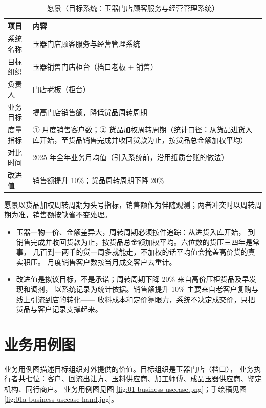 \begin{table}[H]
\centering
\caption{愿景（目标系统：玉器门店顾客服务与经营管理系统）}
\begin{tabularx}{\textwidth}{@{}L{2.6cm} Y@{}}
\toprule
项目 & 内容 \\
\midrule
系统名称 & 玉器门店顾客服务与经营管理系统 \\
目标组织 & 玉器销售门店柜台（档口老板 + 销售） \\
负责人 & 门店老板（柜台） \\
业务目标 & 提高门店销售额，降低货品周转周期 \\
度量指标 & ① 月度销售客户数；② 货品加权周转周期（统计口径：从货品进货入库开始，至货品销售完成并收回货款为止，按货品总金额加权平均） \\
对比时间 & 2025 年全年业务月均值（引入系统前，沿用纸质台账的做法） \\
改进值 & 销售额提升 10\%；货品周转周期下降 20\% \\
\bottomrule
\end{tabularx}
\end{table}

愿景以货品加权周转周期为头号指标，销售额作为伴随观测；两者冲突时以周转周期为准，销售额按缺省不变处理。

\begin{itemize}[leftmargin=1.6em, itemsep=2pt]
  \item 玉器一物一价、金额差异大，周转周期必须按件追踪：从进货入库开始，
        到销售完成并收回货款为止，按货品总金额加权平均。六位数的货压三四年是常事，
        几百到一两千的货一周多就能走，不加权的话平均值会掩盖高价货的真实积压。
        月度销售客户数按当月成交客户去重计。
  \item 改进值是拟议目标，不是承诺；周转周期下降 20\% 来自高价压柜货品及早发现和调剂，
        以系统记录为统计依据。销售额提升 10\% 主要来自老客户复购与线上引流到店的转化——
        收料成本和定价靠眼力，系统不决定成交价，只把货品与客户记录支撑起来。
\end{itemize}

\section{业务用例图}

业务用例图描述目标组织对外提供的价值。目标组织是玉器门店（档口），
业务执行者共七位：客户、回流出让方、玉料供应商、加工师傅、成品玉器供应商、鉴定机构、同行商户。
业务用例图见图 \ref{fig:01-business-usecase.png}；手绘稿见图 \ref{fig:01a-business-usecase-hand.jpg}。

